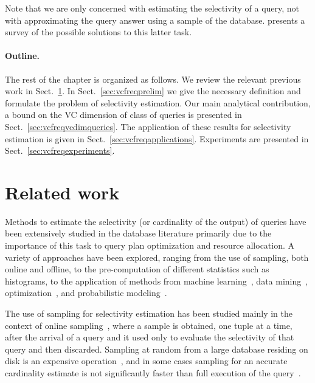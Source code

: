 Note that we are only concerned with estimating the selectivity of a query, not
with approximating the query answer using a sample of the database.
\citet{Das09} presents a survey of the possible solutions to this latter task. %

\paragraph{Outline.} The rest of the chapter is organized as follows. We review
the relevant previous work in Sect.~\ref{sec:vcfreqprevwork}. In
Sect.~\ref{sec:vcfreqprelim} we give the necessary definition and formulate the
problem of selectivity estimation. Our main analytical contribution, a bound on
the VC dimension  of class of queries is presented in
Sect.~\ref{sec:vcfreqvcdimqueries}.  The application of these results for
selectivity estimation is given in Sect.~\ref{sec:vcfreqapplications}.
Experiments are presented in Sect.~\ref{sec:vcfreqexperiments}. 

\section{Related work}\label{sec:vcfreqprevwork}
Methods to estimate the selectivity (or cardinality of the output) of queries
have been extensively studied in the database literature primarily due to the
importance of this task to query plan optimization and resource allocation. A
variety of approaches have been explored, ranging from the use of sampling, both
online and offline, to the pre-computation of different statistics such as
histograms, to the application of methods from machine
learning~\citep{ChenMM90,HarangsriNS97}, data mining~\citep{GryzL04},
optimization~\citep{ChaudhuriDN07,MarklHKMST07}, and probabilistic
modeling~\citep{GetoorTK01,ReS10}.

The use of sampling for selectivity estimation has been studied mainly in the
context of online sampling~\citep{LiptonNS90,LiptonN95}, where a sample is
obtained, one tuple at a time, after the arrival of a query and it used only
to evaluate the selectivity of that query and then discarded. Sampling at random
from a large database residing on disk is an expensive
operation~\citep{Olken93,BrownH06,GemullaLH06}, and in some cases sampling for
an accurate cardinality estimate is not significantly faster than full execution
of the query~\citep{HaasNSS93,HaasNS94}.

